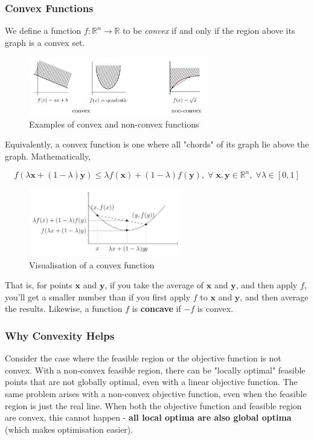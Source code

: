 \documentclass{article}
\begin{document}
\subsubsection{Convex Functions}
We define a function $f:\mathbb{R}^{n} \to \mathbb{R}$ to be \textit{convex} if and only if the region above its graph is a convex set. 
\begin{figure}[H]
    \centering
    \includegraphics[width=0.7\textwidth]{Images/convexityfn.png}
    \caption{Examples of convex and non-convex functions}
    \label{fig:1-convexfns}
\end{figure} 

\noindent Equivalently, a convex function is one where all "chords" of its graph lie above the graph. Mathematically,

\begin{equation}
    f(\lambda \mathbf{x} + (1-\lambda)\mathbf{y}) \leq \lambda f(\mathbf{x}) + (1-\lambda) f(\mathbf{y}), \; \forall \; \mathbf{x}, \mathbf{y} \in \mathbb{R}^{n}, \; \forall \lambda \in [0,1]
\end{equation}

\begin{figure}[H]
    \centering
    \includegraphics[width=0.6\textwidth]{Images/convexityfn2.png}
    \caption{Visualisation of a convex function}
    \label{fig:1-convexfns2}
\end{figure} 

\noindent That is, for points $\mathbf{x}$ and $\mathbf{y}$, if you take the average of $\mathbf{x}$ and $\mathbf{y}$, and then apply $f$, you'll get a smaller number than if you first apply $f$ to $\mathbf{x}$ and $\mathbf{y}$, and then average the results. Likewise, a function $f$ is \textbf{concave} if $-f$ is convex.

\subsubsection{Why Convexity Helps}
Consider the case where the feasible region or the objective function is not convex. With a non-convex feasible region, there can be "locally optimal" feasible points that are not globally optimal, even with a linear objective function. The same problem arises with a non-convex objective function, even when the feasible region is just the real line. When both the objective function and feasible region are convex, this cannot happen - \textbf{all local optima are also global optima} (which makes optimisation easier).
\end{document}
